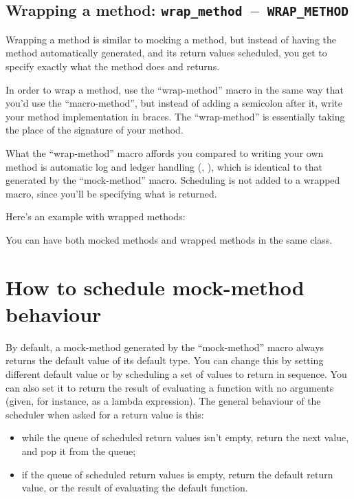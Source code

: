 \documentclass[twoside, a4paper, article]{memoir}
\newcommand*\testudocolor{\color{red!80!blue}}
\newcommand*\testudo[1]{\texttt{\testudocolor{}#1}}
\newcommand*\testudopair[2]{\testudo{#1}~--~\testudo{#2}}
\newcommand\subsectiontestudopair[3]{%
  \subsection[#1]{#1: \testudopair{#2}{#3}}}
\providecommand\typesetexample[1]{%
}
\begin{document}
\typesetexample{mock-class-mock-method}


\subsectiontestudopair{Wrapping a method}{wrap\_method}{WRAP\_METHOD}
\label{sec:wrapping-method}

Wrapping a method is similar to mocking a method, but instead of having the
method automatically generated, and its return values scheduled, you get to
specify exactly what the method does and returns.

In order to wrap a method, use the ``wrap-method'' macro in the same way that
you'd use the ``macro-method'', but instead of adding a semicolon after it,
write your method implementation in braces.  The ``wrap-method'' is essentially
taking the place of the signature of your method.

What the ``wrap-method'' macro affords you compared to writing your own method
is automatic log and ledger handling (,
), which is identical to that generated by
the ``mock-method'' macro.  Scheduling is not added to a wrapped macro, since
you'll be specifying what is returned.

Here's an example with wrapped methods:

\typesetexample{mock-class-wrap-method}

You can have both mocked methods and wrapped methods in the same class.


\section{How to schedule mock-method behaviour}
\label{sec:schedule-mock-method}

By default, a mock-method generated by the ``mock-method'' macro always returns
the default value of its default type.  You can change this by setting
different default value or by scheduling a set of values to return in sequence.
You can also set it to return the result of evaluating a function with no
arguments (given, for instance, as a lambda expression).  The general behaviour
of the scheduler when asked for a return value is this:
\begin{itemize}
\item while the queue of scheduled return values isn't empty, return the next
  value, and pop it from the queue;
\item if the queue of scheduled return values is empty, return the default
  return value, or the result of evaluating the default function.
\end{itemize}
\end{document}

